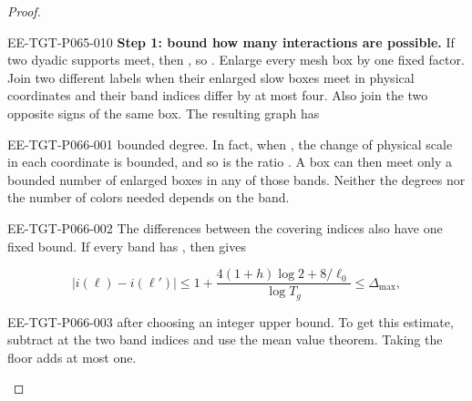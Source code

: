 \begin{proof}
\begin{EESegment}{EE-TGT-P065-010}
\textbf{Step 1: bound how many interactions are possible.} If two dyadic supports meet, then , so . Enlarge every mesh box by one fixed factor. Join two different labels when their enlarged slow boxes meet in physical coordinates and their band indices differ by at most four. Also join the two opposite signs of the same box. The resulting graph has
\end{EESegment}
%
\begin{EESegment}{EE-TGT-P066-001}
bounded degree. In fact, when , the change of physical scale in each coordinate is bounded, and so is the ratio . A box can then meet only a bounded number of enlarged boxes in any of those bands. Neither the degrees nor the number of colors needed depends on the band.
\end{EESegment}

\begin{EESegment}{EE-TGT-P066-002}
The differences between the covering indices  also have one fixed bound. If every band has , then  gives
\end{EESegment}
\begin{equation}
 |i(\ell)-i(\ell')|
 \le 1+\frac{4(1+h)\log2+8/\ell_0}{\log T_g}
 \le\Delta_{\max},
 \tag{6.14}\label{eq:6.14}
\end{equation}
\begin{EESegment}{EE-TGT-P066-003}
after choosing an integer upper bound. To get this estimate, subtract  at the two band indices and use the mean value theorem. Taking the floor adds at most one.
\end{EESegment}


\end{proof}
